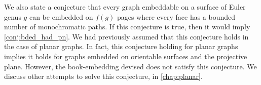We also state a conjecture that every graph embeddable on a surface of Euler genus $g$ can be embedded on $f(g)$ pages where every face has a bounded number of monochromatic paths. If this conjecture is true, then it would imply \cref{conj:bded_had_pn}. We had previously assumed that this conjecture holds in the case of planar graphs. In fact, this conjecture holding for planar graphs implies it holds for graphs embedded on orientable surfaces and the projective plane. However, the book-embedding devised does not satisfy this conjecture. We discuss other attempts to solve this conjecture, in \cref{chap:planar}.